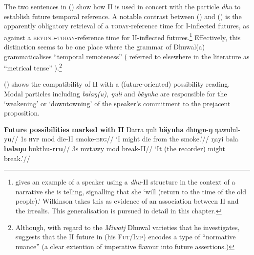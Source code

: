 \noindent The two sentences in () show how \gls{II} is used in concert with the particle \textit{dhu} to establish future temporal reference.
  A notable contrast between () and () is the apparently obligatory retrieval of a \textsc{today}-reference time for \gls{I}-inflected futures, as against a  \textsc{beyond-today}-reference time for \gls{II}-inflected futures.\footnote{\citet[347]{Wilkinson1991} gives an example of a speaker using a \textit{dhu}-\gls{II} structure in the context of a narrative she is telling, signalling that she `will (return to the time of the old people).' Wilkinson takes this as evidence of an association between \gls{II} and the irrealis. This generalisation is pursued in detail in this chapter.} Effectively, this distinction seems to be one place where the grammar of Dhuwal(a) grammaticalises ``temporal remoteness'' (\citealt{Comrie1985,Dahl1985} referred to elsewhere in the literature as ``metrical tense'' \citealp[\textit{e.g.},][204]{Chung}).\footnote{Although, with regard to the \textit{Miwatj} Dhuwal varieties that he investigates, \citet[39]{Heath1980} suggests that the \gls{II} future in (his \textsc{Fut/Imp}) encodes a type of ``normative nuance'' (a clear extention of imperative flavour into future assertions.)}


() shows the compatibility of \gls{II} with a (future-oriented) possibility reading. Modal particles including \textit{balaŋ(u), ŋuli} and \textit{bäynha} are responsible for the `weakening' or `downtowning' of the speaker's commitment to the prejacent proposition. 

\pex\textbf{Future possibilities marked with \gls{II}}
\a{}\begingl\gla Ŋarra ŋuli \textbf{bäynha} dhiŋgu-\textbf{ŋ} ŋawulul-yu//
\glb 1s \textsc{hyp} \gls{mod} die-\gls{II} smoke-\textsc{erg}//
\glft`I might die from the smoke.'//\endgl
\a\begingl\gla ŋayi bala \textbf{balaŋu} bukthu-\textbf{rru}//
\glb 3s \gls{mvtawy} \gls{mod} break-\gls{II}//
\glft`It (the recorder) might break.'\trailingcitation{[DhG~20190417]}//\endgl
\xe



